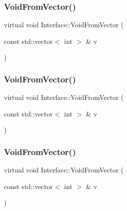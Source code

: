 \mbox{\label{class_interface_ae84fe7e53f881db2f823ad35d004927a}} 
\subsubsection{\texorpdfstring{VoidFromVector()}{VoidFromVector()}\hspace{0.1cm}{\footnotesize\ttfamily [1/3]}}
{\footnotesize\ttfamily virtual void Interface\+::\+Void\+From\+Vector (\begin{DoxyParamCaption}\item[{const std\+::vector$<$ int $>$ \&}]{v }\end{DoxyParamCaption})\hspace{0.3cm}{\ttfamily [pure virtual]}}

\mbox{\label{class_interface_ae84fe7e53f881db2f823ad35d004927a}} 
\subsubsection{\texorpdfstring{VoidFromVector()}{VoidFromVector()}\hspace{0.1cm}{\footnotesize\ttfamily [2/3]}}
{\footnotesize\ttfamily virtual void Interface\+::\+Void\+From\+Vector (\begin{DoxyParamCaption}\item[{const std\+::vector$<$ int $>$ \&}]{v }\end{DoxyParamCaption})\hspace{0.3cm}{\ttfamily [pure virtual]}}

\mbox{\label{class_interface_ae84fe7e53f881db2f823ad35d004927a}} 
\subsubsection{\texorpdfstring{VoidFromVector()}{VoidFromVector()}\hspace{0.1cm}{\footnotesize\ttfamily [3/3]}}
{\footnotesize\ttfamily virtual void Interface\+::\+Void\+From\+Vector (\begin{DoxyParamCaption}\item[{const std\+::vector$<$ int $>$ \&}]{v }\end{DoxyParamCaption})\hspace{0.3cm}{\ttfamily [pure virtual]}}



